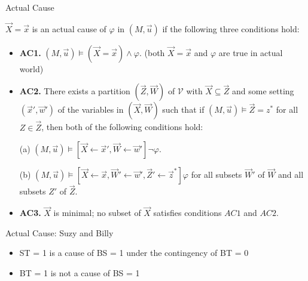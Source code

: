 \begin{frame}{Actual Cause}
    \begin{definition}
        $\vec X = \vec x$ is an actual cause of $\varphi$ in $(M,\vec u)$ if the following three conditions hold:
        \begin{itemize}
            \item  \textbf{AC1.} $(M,\vec u)\models (\vec X = \vec x) \wedge \varphi$.
                  (both $\vec X = \vec x$ and $\varphi$ are true in actual world)
            \item  \textbf{AC2. }There exists a partition $(\vec Z, \vec W)$ of $\mathcal{V}$ with $\vec X \subseteq \vec Z$ and some setting $(\vec x',\vec w')$ of the variables in $(\vec X,\vec W)$ such that if $(M,\vec u)\models \vec Z = z^*$ for all $Z\in \vec Z$, then both of the following conditions hold:

                  (a) $(M,\vec u)\models[\vec X \leftarrow \vec x', \vec W \leftarrow \vec w']\neg \varphi$.

                  (b) $(M,\vec u)\models[\vec X\leftarrow \vec x, \vec W' \leftarrow \vec w', \vec Z'\leftarrow \vec z^*]\varphi$ for all subsets $\vec W'$ of $\vec W$ and all subsets $Z'$ of $\vec Z$.

            \item  \textbf{AC3.} $\vec X$ is minimal; no subset of $\vec X$ satisfies conditions $AC1$ and $AC2$.
        \end{itemize}
    \end{definition}
\end{frame}

\begin{frame}{Actual Cause: Suzy and Billy}
    \begin{figure}
        \centering
    \end{figure}
    \begin{itemize}
        \item ST = 1 is a cause of BS = 1 under the contingency of BT = 0
        \item BT = 1 is not a cause of BS = 1
    \end{itemize}
\end{frame}

